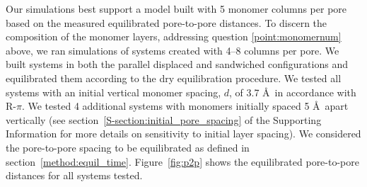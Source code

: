 \documentclass[journal=jpcbfk,manuscript=article]{achemso}
\begin{document}
%  
  
  Our simulations best support a model built with 5 monomer columns per pore based on
  the measured equilibrated pore-to-pore distances. To discern the composition of
  the monomer layers, addressing question \ref{point:monomernum} above, we ran
  simulations of systems created with 4--8 columns per pore. We built systems in both
  the parallel displaced and sandwiched configurations and equilibrated them according
  to the dry equilibration procedure. We tested all systems with an initial vertical monomer 
  spacing, $\mathit{d}$, of 3.7 \AA~in accordance with R-$\pi$. We tested 4 additional 
  systems with monomers initially spaced 5 \AA~apart vertically (see section~\ref{S-section:initial_pore_spacing}
  of the Supporting Information for more details on sensitivity to initial layer spacing). 
  We considered the pore-to-pore spacing to be equilibrated as defined in section~\ref{method:equil_time}.
  Figure~\ref{fig:p2p} shows the equilibrated pore-to-pore distances for all systems tested. 
  
\end{document}
